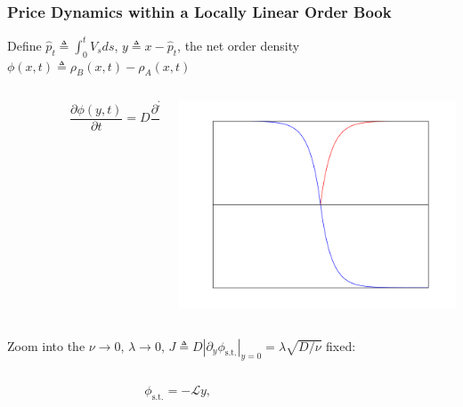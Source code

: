 \documentclass{beamer}
\begin{document}
\begin{frame}
{{}
}
\end{frame}


\begin{frame}
\frametitle{Price Dynamics within a Locally Linear Order Book}
{
\footnotesize{
Define $\hat{p}_t \triangleq \int_0^t V_s ds$, $y\triangleq x-\hat{p}_t$, the net order density $\phi(x,t)\triangleq \rho_B(x,t)-\rho_A(x,t)$
\begin{columns}
\begin{column}{0.7\textwidth}
   $$
   \quad\quad\quad\quad\quad\frac{\partial \phi(y,t)}{\partial t} = D\frac{\partial^2 \phi(y,t)}{\partial y^2} -\nu \phi(y,t) + \lambda
   \text{sign}(p_t - \hat{p}_t - y)
   $$
\end{column}
\begin{column}{0.3\textwidth}  %
     \includegraphics[width=\textwidth,height=.15\textheight]{phist}
\end{column}
\end{columns}
Zoom into the \textit{\color{blue}{universal linear regime}}
$\nu\rightarrow 0$, $\lambda\rightarrow 0$, $J \triangleq D\left|\partial_y \phi_{\text{s.t.}} \right|_{y=0} = \lambda\sqrt{D/\nu}$ fixed:
\begin{columns}
\begin{column}{0.7\textwidth}
$$
\quad\quad\quad\quad\quad\phi_{\text{s.t.}} = -\mathcal{L} y,
$$
\end{column}
\begin{column}{0.3\textwidth}  %

\end{column}
\end{columns}}}
\end{frame}
\end{document}
